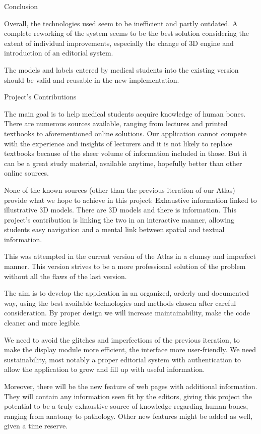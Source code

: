 \secc Conclusion

Overall, the technologies used seem to be inefficient and partly outdated. A complete reworking of the system seems to be the best solution considering the extent of individual improvements, especially the change of 3D engine and introduction of an editorial system.

The models and labels entered by medical students into the existing version should be valid and reusable in the new implementation.

\sec Project's Contributions

The main goal is to help medical students acquire knowledge of human bones. There are numerous sources available, ranging from lectures and printed textbooks to aforementioned online solutions. Our application cannot compete with the experience and insights of lecturers and it is not likely to replace textbooks because of the sheer volume of information included in those. But it can be a great study material, available anytime, hopefully better than other online sources.

None of the known sources (other than the previous iteration of our Atlas) provide what we hope to achieve in this project: Exhaustive information linked to illustrative 3D models. There are 3D models and there is information. This project’s contribution is linking the two in an interactive manner, allowing students easy navigation and a mental link between spatial and textual information.

This was attempted in the current version of the Atlas in a clumsy and imperfect manner. This version strives to be a more professional solution of the problem without all the flaws of the last version.

The aim is to develop the application in an organized, orderly and documented way, using the best available technologies and methods chosen after careful consideration. By proper design we will increase maintainability, make the code cleaner and more legible.

We need to avoid the glitches and imperfections of the previous iteration, to make the display module more efficient, the interface more user-friendly. We need sustainability, most notably a proper editorial system with authentication to allow the application to grow and fill up with useful information.

Moreover, there will be the new feature of web pages with additional information. They will contain any information seen fit by the editors, giving this project the potential to be a truly exhaustive source of knowledge regarding human bones, ranging from anatomy to pathology. Other new features might be added as well, given a time reserve.